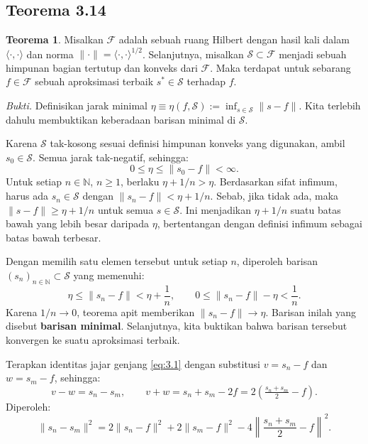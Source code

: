 \documentclass[aspectratio=169,11pt]{beamer}
\theoremstyle{definition}
\newtheorem{teorema}{Teorema}
\newcommand{\N}{\mathbb{N}}
\begin{document}
\subsection{Teorema 3.14}

\begin{frame}[allowframebreaks]{\insertsection}{\insertsubsection}
  \setcounter{teorema}{13}
  \begin{teorema}
    Misalkan $\mathcal{F}$ adalah sebuah ruang Hilbert dengan hasil kali dalam $\langle \cdot, \cdot \rangle$ dan norma $\| \cdot \| = \langle \cdot, \cdot \rangle^{1/2}$. Selanjutnya, misalkan $\mathcal{S} \subset \mathcal{F}$ menjadi sebuah himpunan bagian tertutup dan konveks dari $\mathcal{F}$. Maka terdapat untuk sebarang $f \in \mathcal{F}$ sebuah aproksimasi terbaik $s^* \in \mathcal{S}$ terhadap $f$.
  \end{teorema}
  \textit{Bukti.}
  Definisikan jarak minimal $\eta \equiv \eta(f, \mathcal{S}) := \inf_{s \in \mathcal{S}} \|s - f\|$. Kita terlebih dahulu membuktikan keberadaan barisan minimal di $\mathcal{S}$.

  Karena $\mathcal{S}$ tak-kosong sesuai definisi himpunan konveks yang digunakan, ambil $s_0\in\mathcal{S}$. Semua jarak tak-negatif, sehingga:
  \begin{equation*}
    0\leq\eta\leq\|s_0-f\|<\infty.
  \end{equation*}
  Untuk setiap $n\in\N$, $n\geq 1$, berlaku $\eta+1/n>\eta$. Berdasarkan sifat infimum, harus ada $s_n\in\mathcal{S}$ dengan $\|s_n-f\|<\eta+1/n$. Sebab, jika tidak ada, maka $\|s-f\|\geq\eta+1/n$ untuk semua $s\in\mathcal{S}$. Ini menjadikan $\eta+1/n$ suatu batas bawah yang lebih besar daripada $\eta$, bertentangan dengan definisi infimum sebagai batas bawah terbesar.

  Dengan memilih satu elemen tersebut untuk setiap $n$, diperoleh barisan $(s_n)_{n\in\N}\subset\mathcal{S}$ yang memenuhi:
  \begin{equation*}
    \eta\leq\|s_n-f\|<\eta+\frac{1}{n},
    \qquad 0\leq\|s_n-f\|-\eta<\frac{1}{n}.
  \end{equation*}
  Karena $1/n\to 0$, teorema apit memberikan $\|s_n-f\|\to\eta$. Barisan inilah yang disebut \textbf{barisan minimal}. Selanjutnya, kita buktikan bahwa barisan tersebut konvergen ke suatu aproksimasi terbaik.

  Terapkan identitas jajar genjang \eqref{eq:3.1} dengan substitusi $v = s_n - f$ dan $w = s_m - f$, sehingga:
  \begin{equation*}
    v - w = s_n - s_m, \qquad v + w = s_n + s_m - 2f = 2\left(\tfrac{s_n+s_m}{2} - f\right).
  \end{equation*}
  Diperoleh:
  \begin{equation*}
    \|s_n - s_m\|^2 = 2\|s_n - f\|^2 + 2\|s_m - f\|^2 - 4\left\|\frac{s_n+s_m}{2} - f\right\|^2.
  \end{equation*}


\end{frame}
\end{document}
